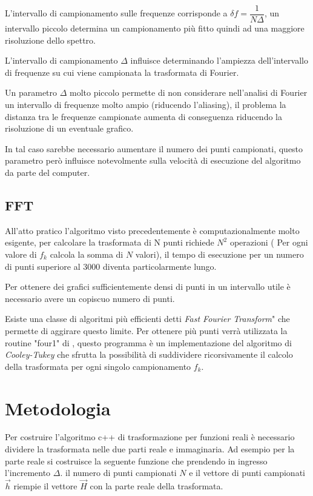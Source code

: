 \documentclass[13pt]{article}
\begin{document}
L'intervallo di campionamento sulle frequenze corrisponde a $ \delta f = \dfrac{1}{N \Delta}$, un intervallo piccolo determina un campionamento più fitto quindi ad una maggiore risoluzione dello spettro.

L'intervallo di campionamento $\Delta$ influisce determinando l'ampiezza dell'intervallo di frequenze su cui viene campionata la trasformata di Fourier.

Un parametro $\Delta$ molto piccolo permette di non considerare nell'analisi di Fourier un intervallo di frequenze molto ampio (riducendo l'aliasing), il problema la distanza tra le frequenze campionate aumenta di conseguenza riducendo la risoluzione di un eventuale grafico.

In tal caso sarebbe necessario aumentare il numero dei punti campionati, questo parametro però influisce notevolmente sulla velocità di esecuzione del algoritmo da parte del computer.

\subsection{FFT}

All'atto pratico l'algoritmo visto precedentemente è computazionalmente molto esigente, per calcolare la trasformata di N punti richiede $N^{2}$ operazioni ( Per ogni valore di $f_{k}$ calcola la somma di $N$ valori), il tempo di esecuzione per un numero di punti superiore al 3000 diventa particolarmente lungo. 

Per ottenere dei grafici sufficientemente densi di punti in un intervallo utile è necessario avere un copiscuo numero di punti.

Esiste una classe di algoritmi più efficienti detti \emph{Fast Fourier Transform}" che permette di aggirare questo limite.
Per ottenere più punti verrà utilizzata la routine "four1" di \cite{recipe}, questo programma è un implementazione del algoritmo di \emph{Cooley-Tukey} che sfrutta la possibilità di suddividere ricorsivamente il calcolo della trasformata per ogni singolo campionamento $f_{k}$.


\section{Metodologia}

Per costruire l'algoritmo c++ di trasformazione per funzioni reali è necessario dividere la trasformata nelle due parti reale e immaginaria.
Ad esempio per la parte reale si costruisce la seguente funzione che prendendo in ingresso l'incremento $\Delta$. il numero di punti campionati $N$ e il vettore di punti campionati $\vec{h}$ riempie il vettore $\vec{H}$ con la parte reale della trasformata.
\end{document}
